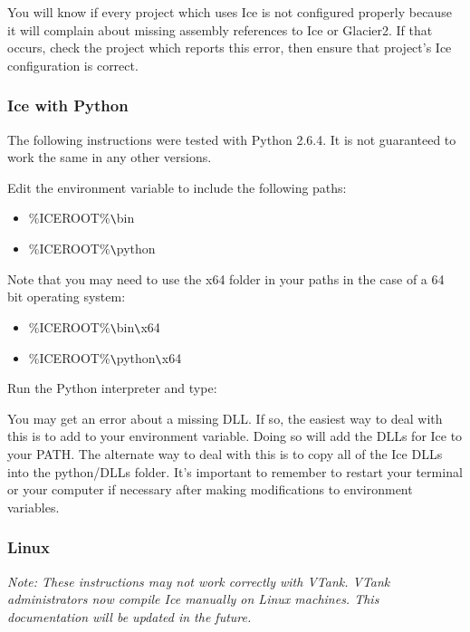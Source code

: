 You will know if every project which uses Ice is not configured properly because it will complain about missing assembly references to Ice or Glacier2. If that occurs, check the project which reports this error, then ensure that project's Ice configuration is correct.

\subsubsection*{Ice with Python}

The following instructions were tested with Python 2.6.4. It is not guaranteed to work the same in any other versions. 

Edit the  environment variable to include the following paths:

\begin{itemize}
	\item \%ICEROOT\%\verb+\+bin
	\item \%ICEROOT\%\verb+\+python
\end{itemize}

Note that you may need to use the x64 folder in your paths in the case of a 64 bit operating system:

\begin{itemize}
	\item \%ICEROOT\%\verb+\+bin\verb+\+x64
	\item \%ICEROOT\%\verb+\+python\verb+\+x64
\end{itemize} 

Run the Python interpreter and type:


You may get an error about a missing DLL. If so, the easiest way to deal with this is to add  to your  environment variable. Doing so will add the DLLs for Ice to your PATH. The alternate way to deal with this is to copy all of the Ice DLLs into the python/DLLs folder. It's important to remember to restart your terminal or your computer if necessary after making modifications to environment variables.

\subsubsection*{Linux}

\emph{Note: These instructions may not work correctly with VTank. VTank administrators now compile Ice manually on Linux machines. This documentation will be updated in the future.}

